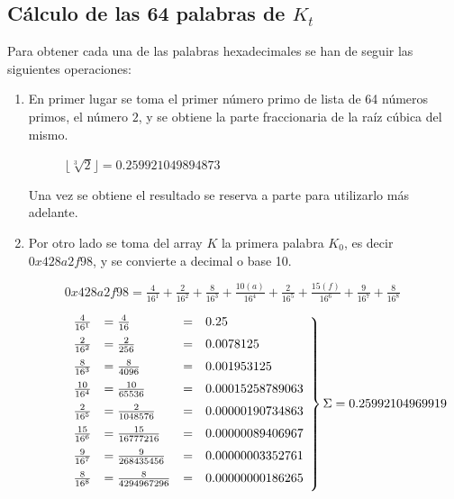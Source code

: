 \documentclass{article}
\begin{document}
    \subsection{Cálculo de las 64 palabras de $K_{t}$}
        Para obtener cada una de las palabras hexadecimales se han de seguir las siguientes operaciones:
        \begin{enumerate}
            \item En primer lugar se toma el primer número primo de lista de 64 números primos, el número $2$, y se obtiene la parte fraccionaria de la raíz cúbica del mismo.
                \begin{figure}[H]
                \centering
                    $\lfloor \sqrt[3]{2} \rfloor = 0.259921049894873$
                \end{figure}
                Una vez se obtiene el resultado se reserva a parte para utilizarlo más adelante.
            
            \item Por otro lado se toma del array $K$ la primera palabra $K_{0}$, es decir $0x428a2f98$, y se convierte a decimal o base 10.
                \begin{figure}[H]
                \centering
                    $0x428a2f98 = \frac{4}{16^{1}} + \frac{2}{16^{2}} + \frac{8}{16^{3}} + \frac{10(a)}{16^{4}} + \frac{2}{16^{5}} + \frac{15(f)}{16^{6}} + \frac{9}{16^{7}} + \frac{8}{16^{8}}$
                \end{figure}
                \begin{figure}[H]
                \centering
                    $\left .
                    \begin{array}{llllr}
                    \vspace{2mm}
                    \frac{4}{16^{1}} & = \frac{4}{16} & = & 0.25 \\ \vspace{2mm}
                    \frac{2}{16^{2}} & = \frac{2}{256} & = & 0.0078125 \\ \vspace{2mm}
                    \frac{8}{16^{3}} & = \frac{8}{4096} & = & 0.001953125 \\ \vspace{2mm}
                    \frac{10}{16^{4}} & = \frac{10}{65536} & = & 0.00015258789063 \\ \vspace{2mm}
                    \frac{2}{16^{5}} & = \frac{2}{1048576} & = & 0.00000190734863 \\ \vspace{2mm}
                    \frac{15}{16^{6}} & = \frac{15}{16777216} & = & 0.00000089406967 \\ \vspace{2mm}
                    \frac{9}{16^{7}} & = \frac{9}{268435456} & = & 0.00000003352761 \\ \vspace{2mm}
                    \frac{8}{16^{8}} & = \frac{8}{4294967296} & = & 0.00000000186265
                    \end{array}
                    \right \} \Sigma = 0.25992104969919$
                \end{figure}
            

\end{enumerate}
\end{document}
